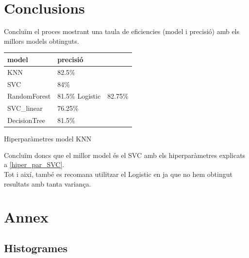 \documentclass[a4paper, 11pt]{article}
\begin{document}
\section{Conclusions}
Concluïm el proces mostrant una taula de eficiencies (model i precisió) amb els millors models obtinguts.
\begin{center} %
    \begin{tabular}{l|l}
        \textbf{model} & \textbf{precisió} \\\hline\hline
        KNN & 82.5\% \\ \hline
        SVC & 84\%\\ \hline
        RandomForest & 81.5\%
        Logistic & 82.75\% \\ \hline
        SVC_linear & 76.25\%\\ \hline
        DecisionTree & 81.5\%\\
    \end{tabular}
    \caption{Hiperparàmetres model KNN}
    \label{tab:afins}
\end{center}
Concluïm doncs que el millor model és el SVC amb els hiperparàmetres explicats a \textcolor{blue}{\ref{hiper_par_SVC}}.\\
Tot i així, també es recomana utilitzar el Logistic en ja que no hem obtingut resultats amb tanta variança.


\newpage
\section{Annex}
\subsection{Histogrames}\label{histogrames}
\end{document}
